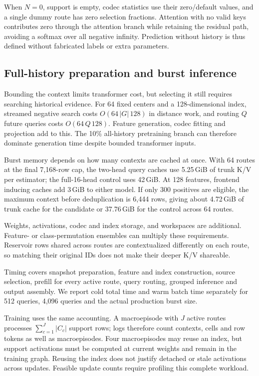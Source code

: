 \documentclass[11pt]{article}
\begin{document}
When $N=0$, support is empty, codec statistics use their zero/default values, and a single dummy route has zero selection fractions. Attention with no valid keys contributes zero through the attention branch while retaining the residual path, avoiding a softmax over all negative infinity. Prediction without history is thus defined without fabricated labels or extra parameters.

\subsection{Full-history preparation and burst inference}

Bounding the context limits transformer cost, but selecting it still requires searching historical evidence. For 64 fixed centers and a 128-dimensional index, streamed negative search costs $O(64\,|G|\,128)$ in distance work, and routing $Q$ future queries costs $O(64\,Q\,128)$. Feature generation, codec fitting and projection add to this. The 10\% all-history pretraining branch can therefore dominate generation time despite bounded transformer inputs.

Burst memory depends on how many contexts are cached at once. With 64 routes at the final 7,168-row cap, the two-head query caches use 5.25\,GiB of trunk K/V per estimator; the full-16-head control uses 42\,GiB. At 128 features, frontend inducing caches add 3\,GiB to either model. If only 300 positives are eligible, the maximum context before deduplication is 6,444 rows, giving about 4.72\,GiB of trunk cache for the candidate or 37.76\,GiB for the control across 64 routes.

Weights, activations, codec and index storage, and workspaces are additional. Feature- or class-permutation ensembles can multiply these requirements. Reservoir rows shared across routes are contextualized differently on each route, so matching their original IDs does not make their deeper K/V shareable.

Timing covers snapshot preparation, feature and index construction, source selection, prefill for every active route, query routing, grouped inference and output assembly. We report cold total time and warm batch time separately for 512 queries, 4,096 queries and the actual production burst size.

Training uses the same accounting. A macroepisode with $J$ active routes processes $\sum_{c=1}^J|C_c|$ support rows; logs therefore count contexts, cells and row tokens as well as macroepisodes. Four macroepisodes may reuse an index, but support activations must be computed at current weights and remain in the training graph. Reusing the index does not justify detached or stale activations across updates. Feasible update counts require profiling this complete workload.
\end{document}
